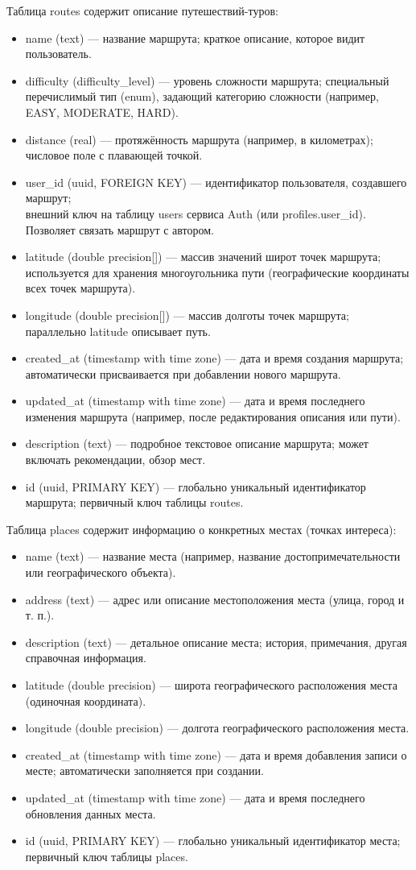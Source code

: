 Таблица routes содержит описание путешествий-туров:
\begin{itemize}
    \item name (text) — название маршрута; краткое описание, которое видит пользователь.
    \item difficulty (difficulty\_level) — уровень сложности маршрута; специальный перечислимый тип (enum), задающий категорию сложности (например, EASY, MODERATE, HARD).
    \item distance (real) — протяжённость маршрута (например, в километрах); числовое поле с плавающей точкой.
    \item user\_id (uuid, FOREIGN KEY) — идентификатор пользователя, создавшего маршрут; \\ внешний ключ на таблицу users сервиса Auth (или profiles.user\_id). Позволяет связать маршрут с автором.
    \item latitude (double precision[]) — массив значений широт точек маршрута; используется для хранения многоугольника пути (географические координаты всех точек маршрута).
    \item longitude (double precision[]) — массив долготы точек маршрута; параллельно latitude описывает путь.
    \item created\_at (timestamp with time zone) — дата и время создания маршрута; автоматически присваивается при добавлении нового маршрута.
    \item updated\_at (timestamp with time zone) — дата и время последнего изменения маршрута (например, после редактирования описания или пути).
    \item description (text) — подробное текстовое описание маршрута; может включать рекомендации, обзор мест.
    \item id (uuid, PRIMARY KEY) — глобально уникальный идентификатор маршрута; первичный ключ таблицы routes.
\end{itemize}
\noindent Таблица places содержит информацию о конкретных местах (точках интереса):
\begin{itemize}
    \item name (text) — название места (например, название достопримечательности или географического объекта).
    \item address (text) — адрес или описание местоположения места (улица, город и т. п.).
    \item description (text) — детальное описание места; история, примечания, другая справочная информация.
    \item latitude (double precision) — широта географического расположения места (одиночная координата).
    \item longitude (double precision) — долгота географического расположения места.
    \item created\_at (timestamp with time zone) — дата и время добавления записи о месте; автоматически заполняется при создании.
    \item updated\_at (timestamp with time zone) — дата и время последнего обновления данных места.
    \item id (uuid, PRIMARY KEY) — глобально уникальный идентификатор места; первичный ключ таблицы places.
\end{itemize}

